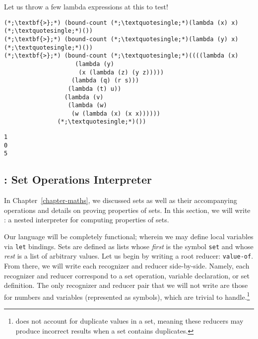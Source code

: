 \noindent Let us throw a few lambda expressions at this to test!

\begin{clonarrow}[]{}\begin{lstlisting}[language=MyNLNSOutput]
(*;\textbf{>};*) (bound-count (*;\textquotesingle;*)(lambda (x) x) (*;\textquotesingle;*)())
(*;\textbf{>};*) (bound-count (*;\textquotesingle;*)(lambda (y) x) (*;\textquotesingle;*)())
(*;\textbf{>};*) (bound-count (*;\textquotesingle;*)((((lambda (x)
                    (lambda (y) 
                     (x (lambda (z) (y z)))))
                   (lambda (q) (r s)))
                  (lambda (t) u))
                 (lambda (v)
                  (lambda (w)
                   (w (lambda (x) (x x))))))            
               (*;\textquotesingle;*)())
\end{lstlisting}
\tcblower
\begin{lstlisting}[language=MyOutput]
1
0
5
\end{lstlisting}
\end{clonarrow}

\clearpage
\subsection*{: Set Operations Interpreter}
In Chapter~\ref{chapter-maths}, we discussed sets as well as their accompanying operations and details on proving properties of sets. In this section, we will write : a nested interpreter for computing properties of sets.

Our language will be completely functional; wherein we may define local variables via \texttt{let} bindings. Sets are defined as lists whose \textit{first} is the symbol \texttt{set} and whose \textit{rest} is a list of arbitrary values.  
Let us begin by writing a root reducer: \texttt{value-of}. From there, we will write each recognizer and reducer side-by-side. Namely, each recognizer and reducer correspond to a set operation, variable declaration, or set definition. The only recognizer and reducer pair that we will not write are those for numbers and variables (represented as symbols), which are trivial to handle.\footnote{ does not account for duplicate values in a set, meaning these reducers may produce incorrect results when a set contains duplicates.}

